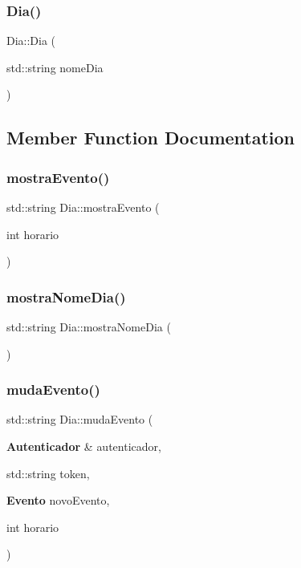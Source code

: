 \mbox{\label{class_dia_afe8f30b790f35aa3daf9b3fd3f4fbc47}} 
\subsubsection{Dia()\hspace{0.1cm}{\footnotesize\ttfamily [2/2]}}
{\footnotesize\ttfamily Dia\+::\+Dia (\begin{DoxyParamCaption}\item[{std\+::string}]{nome\+Dia }\end{DoxyParamCaption})\hspace{0.3cm}{\ttfamily [inline]}}



\subsection{Member Function Documentation}
\mbox{\label{class_dia_abaa81d7022532c495a44bd25cc1c62b8}} 
\subsubsection{mostra\+Evento()}
{\footnotesize\ttfamily std\+::string Dia\+::mostra\+Evento (\begin{DoxyParamCaption}\item[{int}]{horario }\end{DoxyParamCaption})\hspace{0.3cm}{\ttfamily [inline]}}

\mbox{\label{class_dia_adcb76aff8c985bb5bc0fbe419218835f}} 
\subsubsection{mostra\+Nome\+Dia()}
{\footnotesize\ttfamily std\+::string Dia\+::mostra\+Nome\+Dia (\begin{DoxyParamCaption}{ }\end{DoxyParamCaption})\hspace{0.3cm}{\ttfamily [inline]}}

\mbox{\label{class_dia_a6be3327e67045f8cb77ce2af6d6e291a}} 
\subsubsection{muda\+Evento()}
{\footnotesize\ttfamily std\+::string Dia\+::muda\+Evento (\begin{DoxyParamCaption}\item[{\textbf{ Autenticador} \&}]{autenticador,  }\item[{std\+::string}]{token,  }\item[{\textbf{ Evento}}]{novo\+Evento,  }\item[{int}]{horario }\end{DoxyParamCaption})\hspace{0.3cm}{\ttfamily [inline]}}

